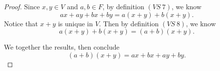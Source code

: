 \begin{Exercise}
\begin{proof}
Since $x,y \in V$ and $a,b\in F$, by definition $(VS\ 7)$, we know
$$
a x+a y+b x+b y = a(x+y) + b(x+y).
$$
Notice that $x+y$ is unique in $V$. Then by definition $(VS\ 8)$, we know
$$
a(x+y) + b(x+y) = (a+b)(x+y).
$$

We together the results, then conclude
$$
(a+b)(x+y) = a x + b x + a y + b y.
$$
\end{proof}
\end{Exercise}